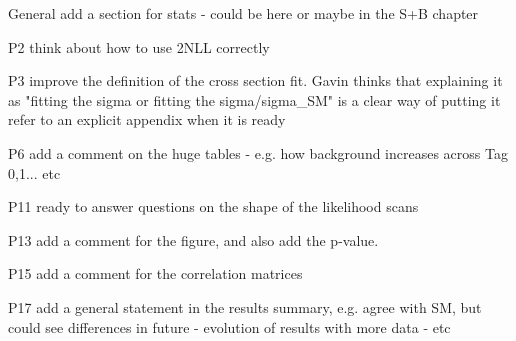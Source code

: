 General 
add a section for stats - could be here or maybe in the S+B chapter

P2
think about how to use 2NLL correctly

P3 
improve the definition of the cross section fit. Gavin thinks that explaining it as
"fitting the sigma or fitting the sigma/sigma_SM" is a clear way of putting it
refer to an explicit appendix when it is ready

P6
add a comment on the huge tables - e.g. how background increases across Tag 0,1... etc

P11
ready to answer questions on the shape of the likelihood scans

P13
add a comment for the figure, and also add the p-value.

P15 
add a comment for the correlation matrices

P17
add a general statement in the results summary, e.g. agree with SM, 
but could see differences in future - evolution of results with more data - etc
